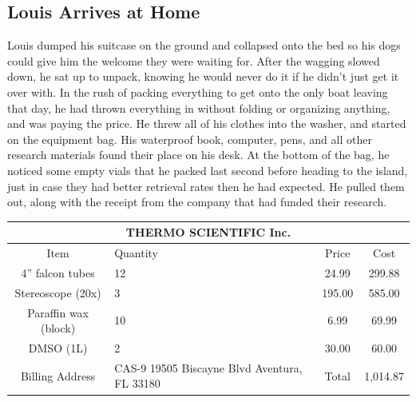\documentclass[12pt, fleqn, AofM.tex]{subfiles}
\begin{document}
\subsection{Louis Arrives at Home}
Louis dumped his suitcase on the ground and collapsed onto the bed so his dogs could give him the welcome they were waiting for. After the wagging slowed down, he sat up to unpack, knowing he would never do it if he didn't just get it over with. In the rush of packing everything to get onto the only boat leaving that day, he had thrown everything in without folding or organizing anything, and was paying the price. He threw all of his clothes into the washer, and started on the equipment bag. His waterproof book, computer, pens, and all other research materials found their place on his desk. At the bottom of the bag, he noticed some empty vials that he packed last second before heading to the island, just in case they had better retrieval rates then he had expected. He pulled them out, along with the receipt from the company that had funded their research.

\begin{center}
	\begin{tabularx}{.9\linewidth}{c X c c}
		\multicolumn{4}{c}{THERMO SCIENTIFIC Inc.}\\
		\hline
		Item & Quantity & Price & Cost \\
		\hline
		4” falcon tubes & 12 & 24.99 & 299.88 \\
		Stereoscope (20x) & 3 & 195.00 & 585.00 \\
		Paraffin wax (block) & 10 & 6.99 & 69.99 \\
		DMSO (1L) & 2 & 30.00 & 60.00 \\
		\hline
		 Billing Address & CAS-9 19505 Biscayne Blvd Aventura, FL 33180 & Total & 1,014.87 \\
	\end{tabularx}
\end{center}
\end{document}
